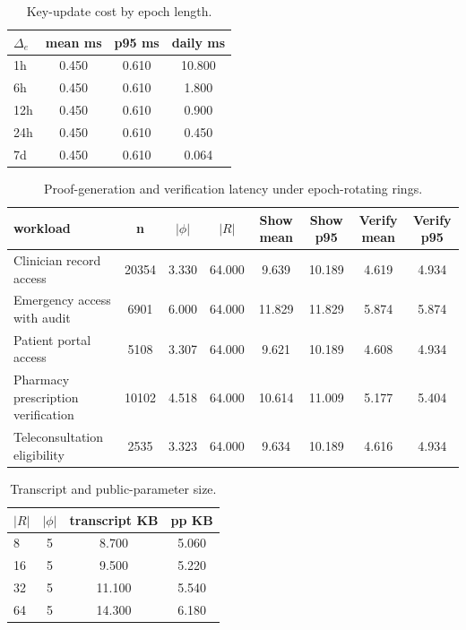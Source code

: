 \begin{table}[htbp]
\centering
\caption{Key-update cost by epoch length.}
\label{tab:key-update}
\begin{tabular}{@{}lccc@{}}
\toprule
$\Delta_e$ & mean ms & p95 ms & daily ms \\
\midrule
1h & 0.450 & 0.610 & 10.800 \\
6h & 0.450 & 0.610 & 1.800 \\
12h & 0.450 & 0.610 & 0.900 \\
24h & 0.450 & 0.610 & 0.450 \\
7d & 0.450 & 0.610 & 0.064 \\
\bottomrule
\end{tabular}
\end{table}


\begin{table}[htbp]
\centering
\caption{Proof-generation and verification latency under epoch-rotating rings.}
\label{tab:proof-verify}
\begin{tabular}{@{}lccccccc@{}}
\toprule
workload & n & $|\phi|$ & $|R|$ & Show mean & Show p95 & Verify mean & Verify p95 \\
\midrule
Clinician record access & 20354 & 3.330 & 64.000 & 9.639 & 10.189 & 4.619 & 4.934 \\
Emergency access with audit & 6901 & 6.000 & 64.000 & 11.829 & 11.829 & 5.874 & 5.874 \\
Patient portal access & 5108 & 3.307 & 64.000 & 9.621 & 10.189 & 4.608 & 4.934 \\
Pharmacy prescription verification & 10102 & 4.518 & 64.000 & 10.614 & 11.009 & 5.177 & 5.404 \\
Teleconsultation eligibility & 2535 & 3.323 & 64.000 & 9.634 & 10.189 & 4.616 & 4.934 \\
\bottomrule
\end{tabular}
\end{table}


\begin{table}[htbp]
\centering
\caption{Transcript and public-parameter size.}
\label{tab:size}
\begin{tabular}{@{}lccc@{}}
\toprule
$|R|$ & $|\phi|$ & transcript KB & pp KB \\
\midrule
8 & 5 & 8.700 & 5.060 \\
16 & 5 & 9.500 & 5.220 \\
32 & 5 & 11.100 & 5.540 \\
64 & 5 & 14.300 & 6.180 \\
\bottomrule
\end{tabular}
\end{table}


